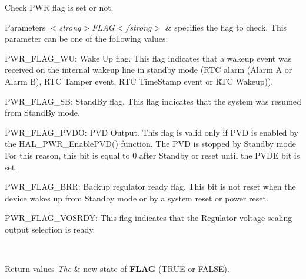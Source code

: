 Check P\+WR flag is set or not. 


\begin{DoxyParams}{Parameters}
{\em $<$strong$>$\+F\+L\+A\+G$<$/strong$>$} & specifies the flag to check. This parameter can be one of the following values\+: \begin{DoxyItemize}
\item P\+W\+R\+\_\+\+F\+L\+A\+G\+\_\+\+WU\+: Wake Up flag. This flag indicates that a wakeup event was received on the internal wakeup line in standby mode (R\+TC alarm (Alarm A or Alarm B), R\+TC Tamper event, R\+TC Time\+Stamp event or R\+TC Wakeup)). \item P\+W\+R\+\_\+\+F\+L\+A\+G\+\_\+\+SB\+: Stand\+By flag. This flag indicates that the system was resumed from Stand\+By mode.\end{DoxyItemize}
\begin{DoxyItemize}
\item P\+W\+R\+\_\+\+F\+L\+A\+G\+\_\+\+P\+V\+DO\+: P\+VD Output. This flag is valid only if P\+VD is enabled by the H\+A\+L\+\_\+\+P\+W\+R\+\_\+\+Enable\+P\+V\+D() function. The P\+VD is stopped by Standby mode For this reason, this bit is equal to 0 after Standby or reset until the P\+V\+DE bit is set. \item P\+W\+R\+\_\+\+F\+L\+A\+G\+\_\+\+B\+RR\+: Backup regulator ready flag. This bit is not reset when the device wakes up from Standby mode or by a system reset or power reset.\end{DoxyItemize}
\begin{DoxyItemize}
\item P\+W\+R\+\_\+\+F\+L\+A\+G\+\_\+\+V\+O\+S\+R\+DY\+: This flag indicates that the Regulator voltage scaling output selection is ready. \end{DoxyItemize}
\\
\hline
\end{DoxyParams}

\begin{DoxyRetVals}{Return values}
{\em The} & new state of {\bfseries{F\+L\+AG}} (T\+R\+UE or F\+A\+L\+SE). \\
\hline
\end{DoxyRetVals}
\mbox{\label{group___p_w_r___exported___macro_gac0fb2218bc050f5d8fdb1a3f28590352}} 
